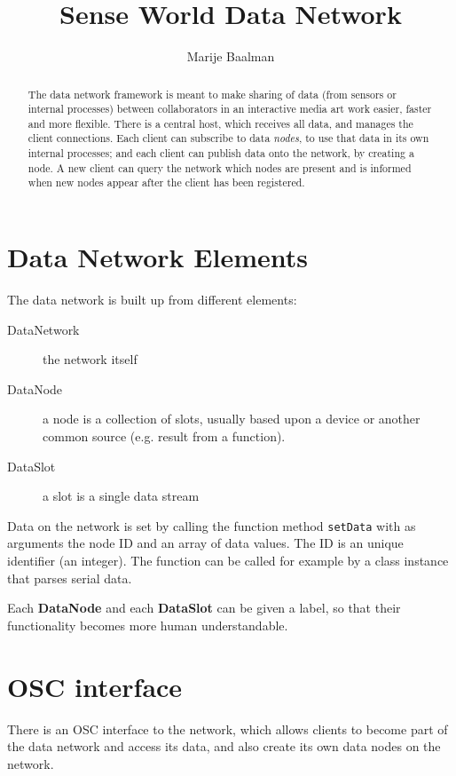 \documentclass[letterpaper,10pt]{article}
\title{Sense World Data Network}
\author{Marije Baalman}
\begin{document}

\maketitle

\begin{abstract}
The data network framework is meant to make sharing of data (from sensors or internal processes) between collaborators in an interactive media art work easier, faster and more flexible. There is a central host, which receives all data, and manages the client connections. Each client can subscribe to data \textit{nodes}, to use that data in its own internal processes; and each client can publish data onto the network, by creating a node. A new client can query the network which nodes are present and is informed when new nodes appear after the client has been registered.
\end{abstract}

\section{Data Network Elements}

The data network is built up from different elements:
\begin{description}
 \item [DataNetwork] the network itself
 \item [DataNode] a node is a collection of slots, usually based upon a device or another common source (e.g. result from a function).
 \item [DataSlot] a slot is a single data stream
\end{description}

Data on the network is set by calling the function method \verb|setData| with as arguments the node ID and an array of data values. The ID is an unique identifier (an integer). The function can be called for example by a class instance that parses serial data.

Each \textbf{DataNode} and each \textbf{DataSlot} can be given a label, so that their functionality becomes more human understandable.

\section{OSC interface}
There is an OSC interface to the network, which allows clients to become part of the data network and access its data, and also create its own data nodes on the network.
\end{document}
